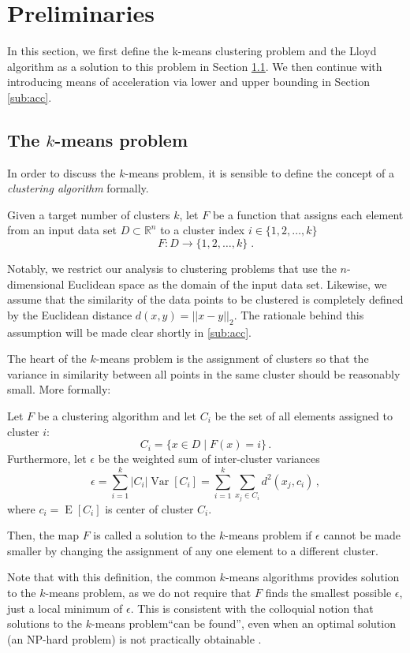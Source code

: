 \newcommand{\kmeans}{$k$-means problem\xspace}

\section{Preliminaries}\label{Preliminaries}

In this section, we first define the k-means clustering problem and the Lloyd algorithm as a solution to this problem in Section \ref{subsec: kmeans}.
We then continue with introducing means of acceleration via lower and upper bounding in Section \ref{sub:acc}.


\subsection{The \kmeans} \label{subsec: kmeans}

In order to discuss the \kmeans, it is sensible to define the concept of a \emph{clustering algorithm} formally.
\begin{definition}
	Given a target number of clusters $k$,
	let $F$ be a function that assigns each element from an input data set $D\subset \mathbb{R}^n$ to a
	cluster index $i \in \{1, 2, \ldots, k\}$
	$$ F:D \to \{1, 2, \ldots, k\} \;.$$
\end{definition}
Notably, we restrict our analysis to clustering problems that use the $n$-dimensional Euclidean space as the domain of the input data set.
Likewise, we assume that the similarity of the data points to be clustered is completely defined by the Euclidean distance $d(x,y)= || x-y ||_2 $.
The rationale behind this assumption will be made clear shortly in \autoref{sub:acc}.

The heart of the \kmeans is the assignment of clusters so that the variance in similarity between all points in the same cluster should be reasonably small.
More formally:
\begin{definition}[\kmeans]
	Let $F$ be a clustering algorithm
	and let $C_i$ be the set of all elements assigned to cluster $i$:
	$$ C_i = \{x \in D \mid F(x) = i\} \,.$$
	Furthermore, let $\epsilon$ be the weighted sum of inter-cluster variances
	$$ \epsilon = \sum_{i=1}^k |C_i| \operatorname{Var}[C_i] = \sum_{i=1}^k \sum_{x_j \in C_i}  d^2(x_j, c_i)\,, $$
	where $c_i = \operatorname{E}[C_i]$ is center of cluster $C_i$.

	Then, the map $F$ is called a solution to the \kmeans
	if $\epsilon$ cannot be made smaller by changing the assignment of any one element to a different cluster.
\end{definition}
Note that with this definition, the common $k$-means algorithms provides solution to the \kmeans,
as we do not require that $F$ finds the smallest possible $\epsilon$,
just a local minimum of $\epsilon$.
This is consistent with the colloquial notion that solutions to the \kmeans ``can be found'',
even when an optimal solution (an NP-hard problem) is not practically obtainable \cite{}.

